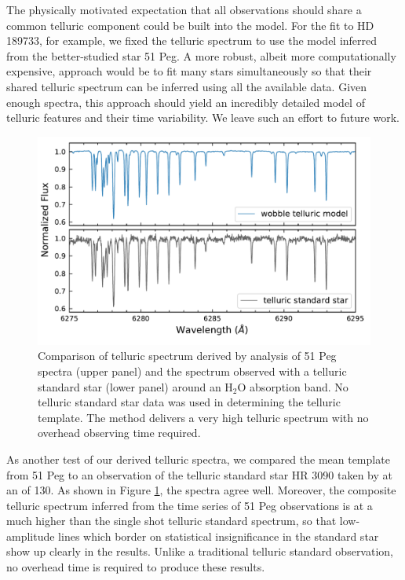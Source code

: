\documentclass[modern]{aastex62}
\begin{document}
The physically motivated expectation that all observations should share a common telluric component could be built into the \wobble model. 
For the fit to HD 189733, for example, we fixed the telluric spectrum to use the model inferred from the better-studied star 51 Peg. 
A more robust, albeit more computationally expensive, approach would be to fit many stars simultaneously so that their shared telluric spectrum can be inferred using all the available data. 
Given enough spectra, this approach should yield an incredibly detailed model of telluric features and their time variability. 
We leave such an effort to future work. 

\begin{figure}
\centering
\includegraphics[width=5in]{telluric_standard}
\caption{Comparison of telluric spectrum derived by \wobble analysis of 51 Peg spectra (upper panel) and the spectrum observed with a telluric standard star (lower panel) around an H$_2$O absorption band. No telluric standard star data was used in determining the \wobble telluric template. The \wobble method delivers a very high \SNR telluric spectrum with no overhead observing time required.}
\label{fig:telluric_standard}
\end{figure}

As another test of our derived telluric spectra, we compared the mean template from 51 Peg to an observation of the telluric standard star HR 3090 taken by \HARPS at an \SNR of 130. 
As shown in Figure \ref{fig:telluric_standard}, the spectra agree well. 
Moreover, the composite telluric spectrum inferred from the time series of 51 Peg observations is at a much higher \SNR than the single shot telluric standard spectrum, so that low-amplitude lines which border on statistical insignificance in the standard star show up clearly in the \wobble results. 
Unlike a traditional telluric standard observation, no overhead time is required to produce these results.
\end{document}

